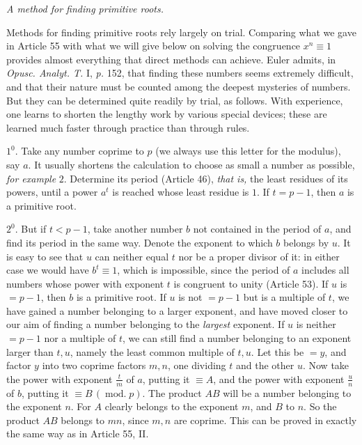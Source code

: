 \begin{center}\emph{A method for finding primitive roots.}\end{center}

Methods for finding primitive roots rely largely on trial. Comparing what we gave in Article 55 with what we will give below on solving the congruence $x^n\equiv1$ provides almost everything that direct methods can achieve. Euler admits, in \emph{Opusc. Analyt. T.} I, \emph{p.} 152, that finding these numbers seems extremely difficult, and that their nature must be counted among the deepest mysteries of numbers. But they can be determined quite readily by trial, as follows. With experience, one learns to shorten the lengthy work by various special devices; these are learned much faster through practice than through rules.

$1^0$. Take any number coprime to $p$ (we always use this letter for the modulus), say $a$. It usually shortens the calculation to choose as small a number as possible, \emph{for example} $2$. Determine its period (Article 46), \emph{that is,} the least residues of its powers, until a power $a^t$ is reached whose least residue is $1$. If $t=p-1$, then $a$ is a primitive root.

$2^0$. But if $t<p-1$, take another number $b$ not contained in the period of $a$, and find its period in the same way. Denote the exponent to which $b$ belongs by $u$. It is easy to see that $u$ can neither equal $t$ nor be a proper divisor of it: in either case we would have $b^t\equiv1$, which is impossible, since the period of $a$ includes all numbers whose power with exponent $t$ is congruent to unity (Article 53). If $u$ is $=p-1$, then $b$ is a primitive root. If $u$ is not $=p-1$ but is a multiple of $t$, we have gained a number belonging to a larger exponent, and have moved closer to our aim of finding a number belonging to the \emph{largest} exponent. If $u$ is neither $=p-1$ nor a multiple of $t$, we can still find a number belonging to an exponent larger than $t,u$, namely the least common multiple of $t,u$. Let this be $=y$, and factor $y$ into two coprime factors $m,n$, one dividing $t$ and the other $u$. Now take the power with exponent $\frac{t}{m}$ of $a$, putting it $\equiv A$, and the
power with exponent $\frac{u}{n}$ of $b$, putting it $\equiv B\,(\operatorname{mod.}p)$. The product $AB$ will be a number belonging to the exponent $n$. For $A$ clearly belongs to the exponent $m$, and $B$ to $n$. So the product $AB$ belongs to $mn$, since $m,n$ are coprime. This can be proved in exactly the same way as in Article 55, II.

